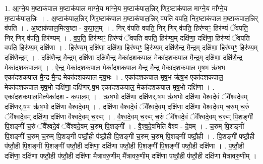 \documentclass[17pt]{extarticle}
\begin{document}
1. आ॒ग्ने॒य म॒ष्टाक॑पाल म॒ष्टाक॑पाल माग्ने॒य मा᳚ग्ने॒य म॒ष्टाक॑पाल॒न्निर् णिर॒ष्टाक॑पाल माग्ने॒य मा᳚ग्ने॒य म॒ष्टाक॑पाल॒न्निः । . अ॒ष्टाक॑पाल॒न्निर् णिर॒ष्टाक॑पाल म॒ष्टाक॑पाल॒न्निर् व॑पति वपति॒ निर॒ष्टाक॑पाल म॒ष्टाक॑पाल॒न्निर् व॑पति । . अ॒ष्टाक॑पाल॒मित्य॒ष्टा - क॒पा॒ल॒म् । . निर् व॑पति वपति॒ निर् णिर् व॑पति॒ हिर॑ण्यꣳ॒॒ हिर॑ण्यं ॅवपति॒ निर् णिर् व॑पति॒ हिर॑ण्यम् । . व॒प॒ति॒ हिर॑ण्यꣳ॒॒ हिर॑ण्यं ॅवपति वपति॒ हिर॑ण्य॒म् दक्षि॑णा॒ दक्षि॑णा॒ हिर॑ण्यं ॅवपति वपति॒ हिर॑ण्य॒म् दक्षि॑णा । . हिर॑ण्य॒म् दक्षि॑णा॒ दक्षि॑णा॒ हिर॑ण्यꣳ॒॒ हिर॑ण्य॒म् दक्षि॑णै॒न्द्र मै॒न्द्रम् दक्षि॑णा॒ हिर॑ण्यꣳ॒॒ हिर॑ण्य॒म् दक्षि॑णै॒न्द्रम् । . दक्षि॑णै॒न्द्र मै॒न्द्रम् दक्षि॑णा॒ दक्षि॑णै॒न्द्र मेका॑दशकपाल॒ मेका॑दशकपाल मै॒न्द्रम् दक्षि॑णा॒ दक्षि॑णै॒न्द्र मेका॑दशकपालम् । . ऐ॒न्द्र मेका॑दशकपाल॒ मेका॑दशकपाल मै॒न्द्र मै॒न्द्र मेका॑दशकपाल मृष॒भ ऋ॑ष॒भ एका॑दशकपाल मै॒न्द्र मै॒न्द्र मेका॑दशकपाल मृष॒भः । . एका॑दशकपाल मृष॒भ ऋ॑ष॒भ एका॑दशकपाल॒ मेका॑दशकपाल मृष॒भो दक्षि॑णा॒ दक्षि॑णर्.ष॒भ एका॑दशकपाल॒ मेका॑दशकपाल मृष॒भो दक्षि॑णा । . एका॑दशकपाल॒मित्येका॑दश - क॒पा॒ल॒म् । . ऋ॒ष॒भो दक्षि॑णा॒ दक्षि॑णर्.ष॒भ ऋ॑ष॒भो दक्षि॑णा वैश्वदे॒वं ॅवै᳚श्वदे॒वम् दक्षि॑णर्.ष॒भ ऋ॑ष॒भो दक्षि॑णा वैश्वदे॒वम् । . दक्षि॑णा वैश्वदे॒वं ॅवै᳚श्वदे॒वम् दक्षि॑णा॒ दक्षि॑णा वैश्वदे॒वम् च॒रुम् च॒रुं ॅवै᳚श्वदे॒वम् दक्षि॑णा॒ दक्षि॑णा वैश्वदे॒वम् च॒रुम् । . वै॒श्व॒दे॒वम् च॒रुम् च॒रुं ॅवै᳚श्वदे॒वं ॅवै᳚श्वदे॒वम् च॒रुम् पि॒शङ्गी॑ पि॒शङ्गी॑ च॒रुं ॅवै᳚श्वदे॒वं ॅवै᳚श्वदे॒वम् च॒रुम् पि॒शङ्गी᳚ । . वै॒श्व॒दे॒वमिति॑ वैश्व - दे॒वम् । . च॒रुम् पि॒शङ्गी॑ पि॒शङ्गी॑ च॒रुम् च॒रुम् पि॒शङ्गी॑ पष्ठौ॒ही प॑ष्ठौ॒ही पि॒शङ्गी॑ च॒रुम् च॒रुम् पि॒शङ्गी॑ पष्ठौ॒ही । . पि॒शङ्गी॑ पष्ठौ॒ही प॑ष्ठौ॒ही पि॒शङ्गी॑ पि॒शङ्गी॑ पष्ठौ॒ही दक्षि॑णा॒ दक्षि॑णा पष्ठौ॒ही पि॒शङ्गी॑ पि॒शङ्गी॑ पष्ठौ॒ही दक्षि॑णा । . प॒ष्ठौ॒ही दक्षि॑णा॒ दक्षि॑णा पष्ठौ॒ही प॑ष्ठौ॒ही दक्षि॑णा मैत्रावरु॒णीम् मै᳚त्रावरु॒णीम् दक्षि॑णा पष्ठौ॒ही प॑ष्ठौ॒ही दक्षि॑णा मैत्रावरु॒णीम् । \newline
\end{document}
